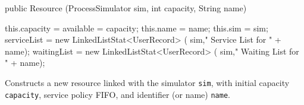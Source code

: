 \begin{htmlonly}
\end{htmlonly}
\begin{code}

   public Resource (ProcessSimulator sim, int capacity, String name) \begin{hide} {
      this.capacity = available = capacity;
      this.name = name;
      this.sim = sim;
      serviceList = new LinkedListStat<UserRecord> (
          sim," Service List for " + name);
      waitingList = new LinkedListStat<UserRecord> (
          sim," Waiting List for " + name);
   }\end{hide}
\end{code}
\begin{tabb}  Constructs a new resource linked with the simulator \texttt{sim},
   with initial capacity \texttt{capacity},
   service policy FIFO, and identifier (or name) \texttt{name}.
\end{tabb}
\begin{htmlonly}
\end{htmlonly}


